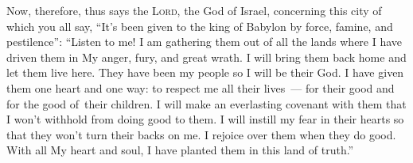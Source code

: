 
\begin{inparaenum}
  
  
  
   Now, therefore, thus says the \textsc{Lord}, the God of Israel, concerning this city of which you all say, ``It's been given to the king of Babylon by force, famine, and pestilence'':%
   ``Listen to me! I am gathering them out of all the lands where I have driven them in My anger, fury, and great wrath. I will bring them back home and let them live here.%
   They have been my people so I will be their God.%
   I have given them one heart and one way: to respect me all their lives~--- for their good and for the good of\understood\ their children.%
   I will make an everlasting covenant with them that I won't withhold from doing good to them. I will instill my fear in their hearts so that they won't turn their backs on me.%
   I rejoice over them when they do good. With all My heart and soul, I have planted them in this land of truth.''%
  
\end{inparaenum}
